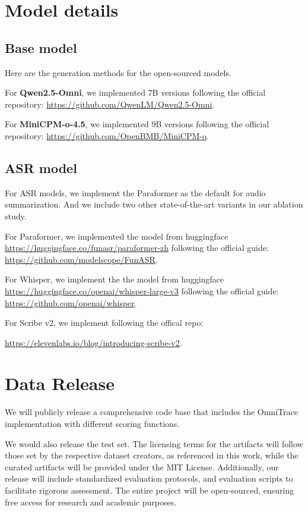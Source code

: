 \section{Model details}

\subsection{Base model}
\label{appendix:base_model}
Here are the generation methods for the open-sourced models.

For \textbf{Qwen2.5-Omni}, we implemented 7B versions following the official repository: \url{https://github.com/QwenLM/Qwen2.5-Omni}.

For \textbf{MiniCPM-o-4.5}, we implemented 9B versions following the official repository: \url{https://github.com/OpenBMB/MiniCPM-o}. 

\subsection{ASR model}
\label{appendix:asr_model}
For ASR models, we implement the Paraformer as the default for audio summarization. And we include two other state-of-the-art variants in our ablation study.

For Paraformer, we implemented the model from huggingface \url{https://huggingface.co/funasr/paraformer-zh} following the official guide: \url{https://github.com/modelscope/FunASR}. 

For Whisper, we implement the the model from huggingface \url{https://huggingface.co/openai/whisper-large-v3} following the official guide: \url{https://github.com/openai/whisper}.

For Scribe v2, we implement following the offical repo: 

\url{https://elevenlabs.io/blog/introducing-scribe-v2}.

\section{Data Release}

We will publicly release a comprehensive code base that includes the OmniTrace implementation with different scoring functions. 

We would also release the test set. The licensing terms for the artifacts will follow those set by the respective dataset creators, as referenced in this work, while the curated artifacts will be provided under the MIT License. 
Additionally, our release will include standardized evaluation protocols, and evaluation scripts to facilitate rigorous assessment. The entire project will be open-sourced, ensuring free access for research and academic purposes.



